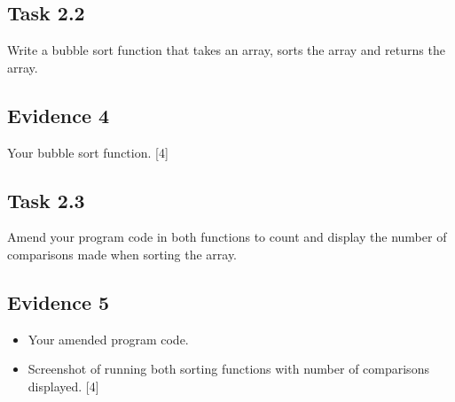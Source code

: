 \subsection*{Task 2.2 }

Write a bubble sort function that takes an array, sorts the array
and returns the array. 

\subsection*{Evidence 4 }

Your bubble sort function.\hfill{} {[}4{]}

\subsection*{Task 2.3 }

Amend your program code in both functions to count and display the
number of comparisons made when sorting the array. 

\subsection*{Evidence 5 }
\begin{itemize}
\item Your amended program code. 
\item Screenshot of running both sorting functions with number of comparisons
displayed.\hfill{} {[}4{]}
\end{itemize}